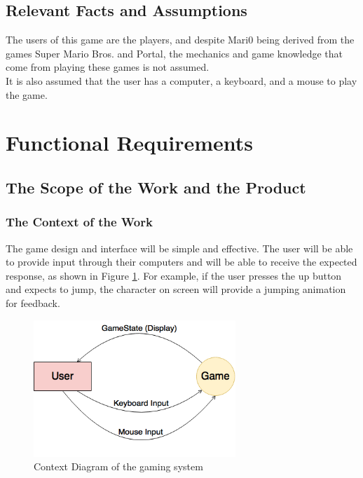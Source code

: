 \documentclass[12pt, titlepage]{article}
\begin{document}
\subsection{Relevant Facts and Assumptions}

The users of this game are the players, and despite Mari0 being derived from the games Super Mario Bros. and Portal, the mechanics and game knowledge that come from playing these games is not assumed. \\
It is also assumed that the user has a computer, a keyboard, and a mouse to play the game.

\section{Functional Requirements}

\subsection{The Scope of the Work and the Product}

\subsubsection{The Context of the Work}
The game design and interface will be simple and effective. The user will be able to provide input through their computers and will be able to receive the expected response, as shown in Figure \ref{fig:context}. For example, if the user presses the up button and expects to jump, the character on screen will provide a jumping animation for feedback.
\begin{figure}[h] %
   \centering
   \includegraphics[width=3in]{Fig1} 
   \caption{Context Diagram of the gaming system}
   \label{fig:context}
\end{figure}
\end{document}
